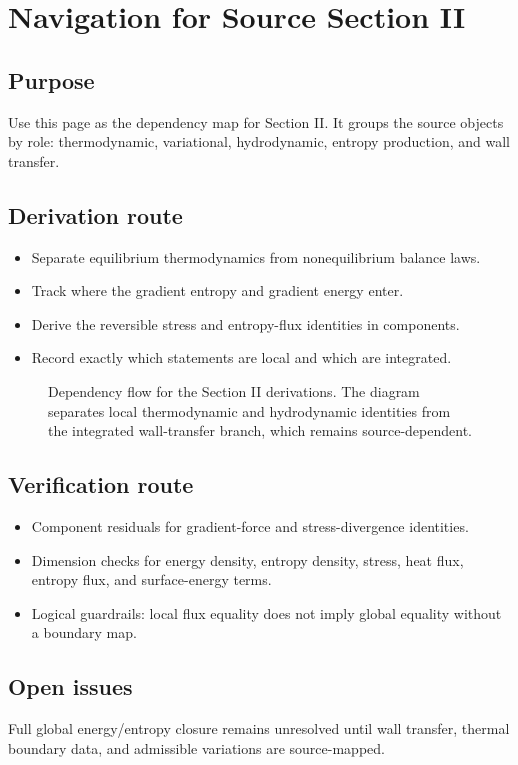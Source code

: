 \section{Navigation for Source Section II}
\label{sec:theory-overview}


\subsection*{Purpose}

Use this page as the dependency map for Section II.  It groups the source
objects by role: thermodynamic, variational, hydrodynamic, entropy production,
and wall transfer.

\subsection*{Derivation route}

\begin{itemize}
\item Separate equilibrium thermodynamics from nonequilibrium balance laws.
\item Track where the gradient entropy and gradient energy enter.
\item Derive the reversible stress and entropy-flux identities in components.
\item Record exactly which statements are local and which are integrated.
\end{itemize}

\begin{figure}[htbp]
\centering
\resizebox{\linewidth}{!}{}
\caption{Dependency flow for the Section II derivations.  The diagram separates
local thermodynamic and hydrodynamic identities from the integrated
wall-transfer branch, which remains source-dependent.}
\label{fig:section-ii-dependency-flow}
\end{figure}

\subsection*{Verification route}

\begin{itemize}
\item Component residuals for gradient-force and stress-divergence identities.
\item Dimension checks for energy density, entropy density, stress, heat flux,
  entropy flux, and surface-energy terms.
\item Logical guardrails: local flux equality does not imply global equality
  without a boundary map.
\end{itemize}

\subsection*{Open issues}

Full global energy/entropy closure remains unresolved until wall transfer,
thermal boundary data, and admissible variations are source-mapped.
